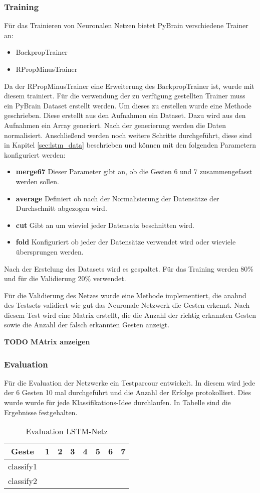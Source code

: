 \subsubsection{Training}
Für das Trainieren von Neuronalen Netzen bietet PyBrain verschiedene 
Trainer an:
\begin{itemize}
\item BackpropTrainer
\item RPropMinusTrainer
\end{itemize}
Da der RPropMinusTrainer eine Erweiterung des BackpropTrainer ist, wurde mit 
diesem trainiert. Für die verwendung der zu verfügung gestellten Trainer 
muss ein PyBrain Dataset erstellt werden. Um dieses zu erstellen wurde eine 
Methode geschrieben. Diese erstellt aus den Aufnahmen ein Dataset. Dazu wird 
aus den Aufnahmen ein Array generiert. Nach der generierung werden die Daten 
normalisiert. Anschließend werden noch weitere Schritte durchgeführt, diese 
sind in Kapitel \autoref{sec:lstm_data} beschrieben und können mit den folgenden 
Parametern konfiguriert werden:
\begin{itemize}
\item \textbf{merge67} Dieser Parameter gibt an, ob die Gesten 6 und 7 
zusammengefasst werden sollen.
\item \textbf{average} Definiert ob nach der Normalisierung der Datensätze der 
Durchschnitt abgezogen wird. 
\item \textbf{cut} Gibt an um wieviel jeder Datensatz beschnitten wird.
\item \textbf{fold} Konfiguriert ob jeder der Datensätze verwendet wird oder
wieviele übersprungen werden.
\end{itemize} 
Nach der Erstelung des Datasets wird es gespaltet. Für das Training werden 
80\% und für die Validierung 20\% verwendet.

Für die Validierung des Netzes wurde eine Methode implementiert, die anahnd 
des Testsets validiert wie gut das Neuronale Netzwerk die Gesten erkennt. Nach 
diesem Test wird eine Matrix erstellt, die die Anzahl der richtig erkannten Gesten 
sowie die Anzahl der falsch erkannten Gesten anzeigt. 

\textbf{TODO MAtrix anzeigen}

\subsubsection{Evaluation}
Für die Evaluation der Netzwerke ein Testparcour entwickelt. In diesem wird 
jede der 6 Gesten 10 mal durchgeführt und die Anzahl der Erfolge protokolliert. 
Dies wurde wurde für jede Klassifikations-Idee durchlaufen. In Tabelle 
\cite{tab:eval} sind die Ergebnisse festgehalten.
\begin{table}
\begin{tabular}{|c|c|c|c|c|c|c|c|}
\hline
 Geste 		& 1 & 2 & 3 & 4 & 5 & 6 & 7 \\
 \hline
 classify1  &	&	&	&	&	&	&	\\
 \hline
 classify2  &	&	&	&	&	&	&	\\
\hline
\end{tabular}
\caption{Evaluation LSTM-Netz}
\label{tab:eval}
\end{table}

